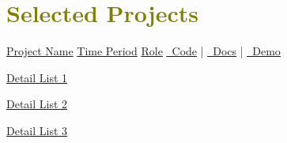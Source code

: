 
\section{\textcolor{olive}{\textbf{Selected Projects}}}
    \resumeSubHeadingListStart

    \resumeSubheading
        {\underline{Project Name}}
        {\underline{Time Period}}
        {\underline{Role}}
        {\href{https://github.com/1chooo/1chooo.com}{\underline{\faGithub\ Code}} | \href{https://docs.1chooo.com}{\underline{{\faBook}\ Docs}} | \href{https://www.1chooo.com}{\underline{\faDesktop\ Demo}}}

        \resumeItemListStart
            \item \underline{Detail List 1}
            \item \underline{Detail List 2}
            \item \underline{Detail List 3}
        \resumeItemListEnd

    \resumeSubHeadingListEnd
